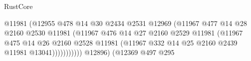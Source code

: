 \begin{lexlean}{RustCore}
\begin{coremodule}
                                                      @11981
                                                      (@12955
                                                        @478
                                                        @14
                                                        @30
                                                        @2434
                                                        @2531
                                                        @12969
                                                        (@11967
                                                          @477
                                                          @14
                                                          @28
                                                          @2160
                                                          @2530
                                                          @11981
                                                          (@11967
                                                            @476
                                                            @14
                                                            @27
                                                            @2160
                                                            @2529
                                                            @11981
                                                            (@11967
                                                              @475
                                                              @14
                                                              @26
                                                              @2160
                                                              @2528
                                                              @11981
                                                              (@11967
                                                                @332
                                                                @14
                                                                @25
                                                                @2160
                                                                @2439
                                                                @11981
                                                                @13041)))))))))))
                                          @12896)
                                        (@12369
                                          @497
                                          @295

\end{coremodule}
\end{lexlean}

